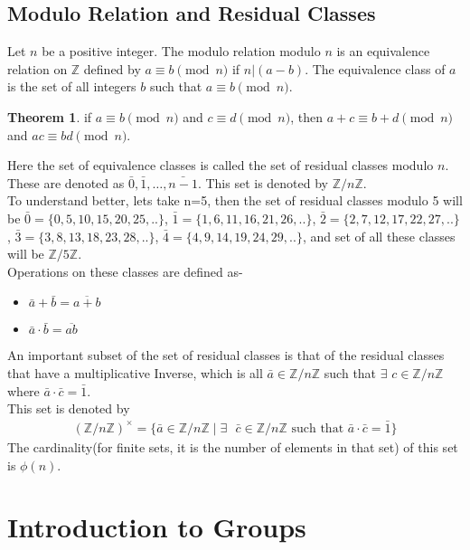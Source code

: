 \documentclass[12pt,a4paper,oneside]{report}
\theoremstyle{definition}
\newtheorem{theorem}{Theorem}
\begin{document}
\section{Modulo Relation and Residual Classes}
Let $n$ be a positive integer. The modulo relation modulo $n$ is an equivalence relation on $\mathbb{Z}$ defined by $a \equiv b \pmod{n}$ if $n | (a - b)$. The equivalence class of $a$ is the set of all integers $b$ such that $a \equiv b \pmod{n}$.
\begin{theorem}
  if $a \equiv b \pmod{n}$ and $c \equiv d \pmod{n}$, then $a + c \equiv b + d \pmod{n}$ and $ac \equiv bd \pmod{n}$.
\end{theorem}
Here the set of equivalence classes is called the set of residual classes modulo $n$. These are denoted as $\bar{0}, \bar{1}, \ldots, \bar{n-1}$. This set is denoted by $\mathbb{Z}/n\mathbb{Z}$.
\\To understand better, lets take n=5, then the set of residual classes modulo 5 will be $\bar{0}=\{0,5,10,15,20,25,..\}$, $\bar{1}=\{1,6,11,16,21,26,..\}$, $\bar{2}=\{2,7,12,17,22,27,..\}$, $\bar{3}=\{3,8,13,18,23,28,..\}$, $\bar{4}=\{4,9,14,19,24,29,..\}$, and set of all these classes will be $\mathbb{Z}/5\mathbb{Z}$.
\\Operations on these classes are defined as-
\begin{itemize}
  \item $\bar{a} + \bar{b} = \overline{a + b}$
  \item $\bar{a} \cdot \bar{b} = \overline{ab}$
\end{itemize}
An important subset of the set of residual classes is that of the residual classes that have a multiplicative Inverse, which is all $\bar{a} \in \mathbb{Z}/n\mathbb{Z}$ such that $\exists$ $c \in \mathbb{Z}/n\mathbb{Z}$ where $\bar{a} \cdot \bar{c} = \bar{1}$.
\\This set is denoted by 
\begin{align*}
  (\mathbb{Z}/n\mathbb{Z})^{\times} = \{\bar{a} \in \mathbb{Z}/n\mathbb{Z} \mid \exists \text{ }  \bar{c} \in \mathbb{Z}/n\mathbb{Z} \text{ such that } \bar{a} \cdot \bar{c} = \bar{1}\}
\end{align*}
The cardinality(for finite sets, it is the number of elements in that set) of this set is $\phi(n)$.
\chapter{Introduction to Groups}
\end{document}
